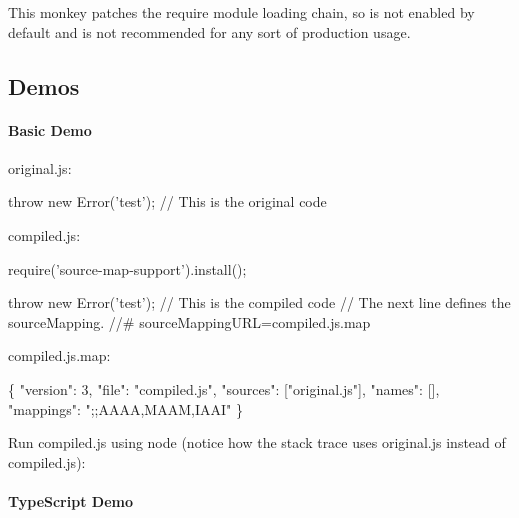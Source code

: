 This monkey patches the {\ttfamily require} module loading chain, so is not enabled by default and is not recommended for any sort of production usage.

\subsection*{Demos}

\paragraph*{Basic Demo}

original.\+js\+:


\begin{DoxyCode}
throw new Error('test'); // This is the original code
\end{DoxyCode}


compiled.\+js\+:


\begin{DoxyCode}
require('source-map-support').install();

throw new Error('test'); // This is the compiled code
// The next line defines the sourceMapping.
//# sourceMappingURL=compiled.js.map
\end{DoxyCode}


compiled.\+js.\+map\+:


\begin{DoxyCode}
\{
  "version": 3,
  "file": "compiled.js",
  "sources": ["original.js"],
  "names": [],
  "mappings": ";;AAAA,MAAM,IAAI"
\}
\end{DoxyCode}


Run compiled.\+js using node (notice how the stack trace uses original.\+js instead of compiled.\+js)\+:




\paragraph*{Type\+Script Demo}

